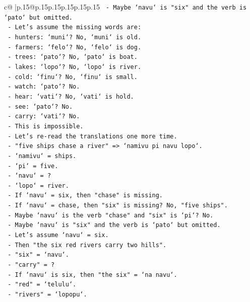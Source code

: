 \documentclass{article}
\begin{document}
{\begin{supertabular}{c@{$\;$}|p{.15\linewidth}@{}p{.15\linewidth}p{.15\linewidth}p{.15\linewidth}p{.15\linewidth}p{.15\linewidth}}
{{{\texttt{  {-} Maybe `navu` is "six" and the verb is `pato` but omitted.} \\
\texttt{  {-} Let's assume the missing words are:} \\
\texttt{    {-} hunters: `muni`? No, `muni` is old.} \\
\texttt{    {-} farmers: `felo`? No, `felo` is dog.} \\
\texttt{    {-} trees: `pato`? No, `pato` is boat.} \\
\texttt{    {-} lakes: `lopo`? No, `lopo` is river.} \\
\texttt{    {-} cold: `finu`? No, `finu` is small.} \\
\texttt{    {-} watch: `pato`? No.} \\
\texttt{    {-} hear: `vati`? No, `vati` is hold.} \\
\texttt{    {-} see: `pato`? No.} \\
\texttt{    {-} carry: `vati`? No.} \\
\texttt{  {-} This is impossible.} \\
\texttt{  {-} Let's re{-}read the translations one more time.} \\
\texttt{  {-} "five ships chase a river" => `namivu pi navu lopo`.} \\
\texttt{    {-} `namivu` = ships.} \\
\texttt{    {-} `pi` = five.} \\
\texttt{    {-} `navu` = ?} \\
\texttt{    {-} `lopo` = river.} \\
\texttt{    {-} If `navu` = six, then "chase" is missing.} \\
\texttt{    {-} If `navu` = chase, then "six" is missing? No, "five ships".} \\
\texttt{    {-} Maybe `navu` is the verb "chase" and "six" is `pi`? No.} \\
\texttt{    {-} Maybe `navu` is "six" and the verb is `pato` but omitted.} \\
\texttt{    {-} Let's assume `navu` = six.} \\
\texttt{    {-} Then "the six red rivers carry two hills".} \\
\texttt{    {-} "six" = `navu`.} \\
\texttt{    {-} "carry" = ?} \\
\texttt{    {-} If `navu` is six, then "the six" = `na navu`.} \\
\texttt{    {-} "red" = `telulu`.} \\
\texttt{    {-} "rivers" = `lopopu`.} \\
}}}
\end{supertabular}}
\end{document}
